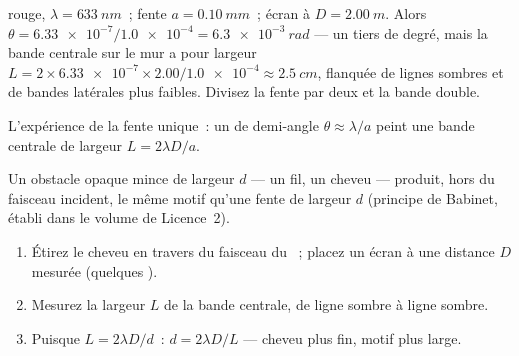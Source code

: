 \begin{example}\label{ex:g12:light-as-wave:slit}
 rouge, $\lambda = \qty{633}{nm}$~; fente
$a = \qty{0.10}{mm}$~; écran à $D = \qty{2.00}{m}$. Alors
$\theta = \num{6.33e-7} / \num{1.0e-4} = \qty{6.3e-3}{rad}$ --- un
tiers de degré, mais la bande centrale sur le mur a pour largeur
$L = 2 \times \num{6.33e-7} \times 2.00 / \num{1.0e-4} \approx
\qty{2.5}{cm}$, flanquée de lignes sombres et de bandes latérales plus
faibles. Divisez la fente par deux et la bande double.
\end{example}

\begin{omfigure}

{\small L'expérience de la fente unique~: un  de demi-angle
$\theta \approx \lambda/a$ peint une bande centrale de largeur
$L = 2\lambda D/a$.}
\end{omfigure}

\begin{proposition}\label{prop:g12:light-as-wave:hair}
Un obstacle opaque mince de largeur $d$ --- un fil, un cheveu ---
produit, hors du faisceau incident, le même motif qu'une fente de
largeur $d$ (principe de Babinet, établi dans le volume de Licence~2).
\end{proposition}
\admitted

\begin{method}\label{met:g12:light-as-wave:hairwidth}
\begin{enumerate}
  \item Étirez le cheveu en travers du faisceau du
        ~; placez un écran à une distance $D$ mesurée
        (quelques ).
  \item Mesurez la largeur $L$ de la bande centrale, de ligne sombre à
        ligne sombre.
  \item Puisque $L = 2\lambda D/d$~: $d = 2\lambda D/L$ --- cheveu plus
        fin, motif plus large.
\end{enumerate}
\end{method}

